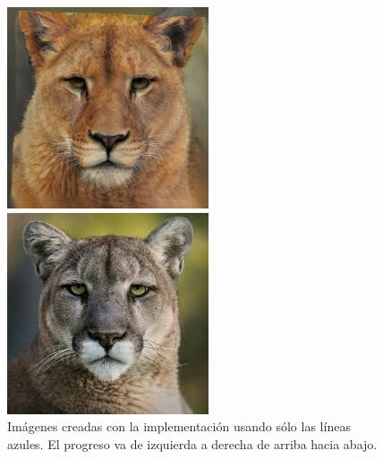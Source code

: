 \documentclass[conference]{IEEEtran}
\begin{document}
\begin{figure}[H]
\begin{multicols}{3}
    \includegraphics[width=1.0\linewidth]{TestsCats/B/img20.png} \par
    \includegraphics[width=1.0\linewidth]{TestsCats/B/img50.png} \par
\end{multicols}
\caption{Imágenes creadas con la implementación usando sólo las líneas azules. El progreso va de izquierda a derecha de arriba hacia abajo.}
\end{figure}
\end{document}
